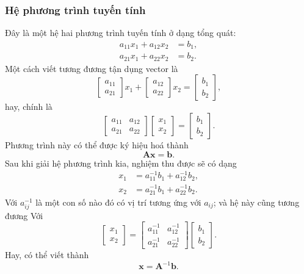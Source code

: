 \subsubsection*{Hệ phương trình tuyến tính}
Đây là một hệ hai phương trình tuyến tính ở dạng tổng quát:
\begin{align*}
a_{11}x_{1} + a_{12}x_{2} &= b_{1}, \\
a_{21}x_{1} + a_{22}x_{2} &= b_{2}.
\end{align*}
Một cách viết tương đương tận dụng vector là
\[\begin{bmatrix}
    a_{11}\\a_{21}
\end{bmatrix}x_{1}+\begin{bmatrix}
    a_{12}\\a_{22}
\end{bmatrix}x_{2}=\begin{bmatrix}
    b_{1}\\b_{2}
\end{bmatrix},\] hay, chính là
\[\begin{bmatrix}
    a_{11}&a_{12}\\
    a_{21}&a_{22}
\end{bmatrix}\begin{bmatrix}
    x_{1}\\x_{2}
\end{bmatrix}=\begin{bmatrix}
    b_{1}\\b_{2}
\end{bmatrix}.\] Phương trình này có thể được ký hiệu hoá thành \[\mathbf{A}\mathbf{x}=\mathbf{b}.\]
Sau khi giải hệ phương trình kia, nghiệm thu được sẽ có dạng
\begin{align*}
x_{1} &= a_{11}^{-1}b_{1} + a_{12}^{-1}b_{2}, \\
x_{2} &= a_{21}^{-1}b_{1} + a_{22}^{-1}b_{2}.
\end{align*}
Với \(a_{ij}^{-1}\) là một con số nào đó có vị trí tương ứng với \(a_{ij}\); và hệ này cũng tương đương Với
\[\begin{bmatrix}
    x_{1}\\x_{2}
\end{bmatrix}=\begin{bmatrix}
    a_{11}^{-1}&a_{12}^{-1}\\
    a_{21}^{-1}&a_{22}^{-1}
\end{bmatrix}\begin{bmatrix}
    b_{1}\\b_{2}
\end{bmatrix}.\] Hay, có thể viết thành \[\mathbf{x}=\mathbf{A}^{-1}\mathbf{b}.\]
